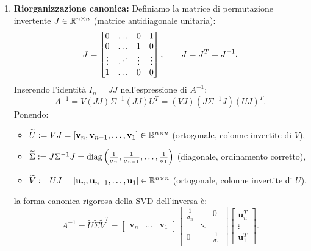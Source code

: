 \begin{example}
\begin{enumerate}
    \item \textbf{Riorganizzazione canonica:}
    Definiamo la matrice di permutazione invertente $J \in \mathbb{R}^{n \times n}$ (matrice antidiagonale unitaria):
    \begin{equation}
        J = \begin{bmatrix}
            0 & \dots & 0 & 1 \\
            0 & \dots & 1 & 0 \\
            \vdots & \mathinner{\mkern1mu\raise1pt\vbox{\kern7pt\hbox{.}}\mkern2mu\raise4pt\hbox{.}\mkern2mu\raise7pt\hbox{.}\mkern1mu} & \vdots & \vdots \\
            1 & \dots & 0 & 0
        \end{bmatrix}, \qquad J = J^T = J^{-1}.
    \end{equation}
    Inserendo l'identit\`a $I_n = J J$ nell'espressione di $A^{-1}$:
    \begin{equation}
        A^{-1} = V (J J) \Sigma^{-1} (J J) U^T = (V J) (J \Sigma^{-1} J) (U J)^T.
    \end{equation}
    Ponendo:
    \begin{itemize}
        \item $\widetilde{U} := V J = [\mathbf{v}_n, \mathbf{v}_{n-1}, \dots, \mathbf{v}_1] \in \mathbb{R}^{n \times n}$ (ortogonale, colonne invertite di $V$),
        \item $\widetilde{\Sigma} := J \Sigma^{-1} J = \operatorname{diag}\left(\frac{1}{\sigma_n}, \frac{1}{\sigma_{n-1}}, \dots, \frac{1}{\sigma_1}\right)$ (diagonale, ordinamento corretto),
        \item $\widetilde{V} := U J = [\mathbf{u}_n, \mathbf{u}_{n-1}, \dots, \mathbf{u}_1] \in \mathbb{R}^{n \times n}$ (ortogonale, colonne invertite di $U$),
    \end{itemize}
    la forma canonica rigorosa della SVD dell'inversa \`e:
    \begin{equation}
        A^{-1} = \widetilde{U} \widetilde{\Sigma} \widetilde{V}^T = \begin{bmatrix} \mathbf{v}_n & \dots & \mathbf{v}_1 \end{bmatrix} \begin{bmatrix} \frac{1}{\sigma_n} & & 0 \\ & \ddots & \\ 0 & & \frac{1}{\sigma_1} \end{bmatrix} \begin{bmatrix} \mathbf{u}_n^T \\ \vdots \\ \mathbf{u}_1^T \end{bmatrix}.
    \end{equation}
\end{enumerate}
\end{example}

